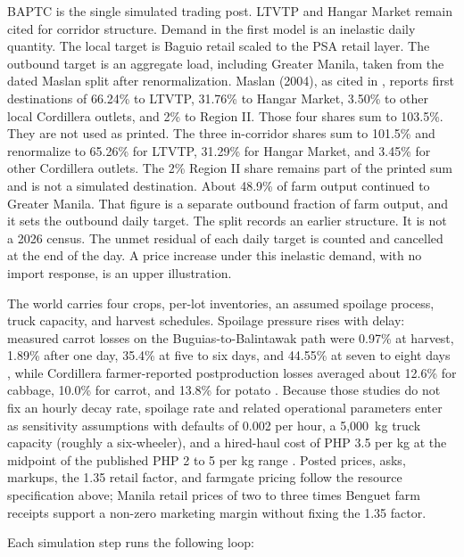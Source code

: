 \documentclass{icsthesis}
\begin{document}
\begin{mainmatter}
			BAPTC is the single simulated trading post. LTVTP and Hangar Market remain cited for corridor structure. Demand in the first model is an inelastic daily quantity. The local target is Baguio retail scaled to the PSA retail layer. The outbound target is an aggregate load, including Greater Manila, taken from the dated Maslan split after renormalization. Maslan (2004), as cited in \citet{Fangasan2009}, reports first destinations of 66.24\% to LTVTP, 31.76\% to Hangar Market, 3.50\% to other local Cordillera outlets, and 2\% to Region II. Those four shares sum to 103.5\%. They are not used as printed. The three in-corridor shares sum to 101.5\% and renormalize to 65.26\% for LTVTP, 31.29\% for Hangar Market, and 3.45\% for other Cordillera outlets. The 2\% Region II share remains part of the printed sum and is not a simulated destination. About 48.9\% of farm output continued to Greater Manila. That figure is a separate outbound fraction of farm output, and it sets the outbound daily target. The split records an earlier structure. It is not a 2026 census. The unmet residual of each daily target is counted and cancelled at the end of the day. A price increase under this inelastic demand, with no import response, is an upper illustration.

			The world carries four crops, per-lot inventories, an assumed spoilage process, truck capacity, and harvest schedules. Spoilage pressure rises with delay: measured carrot losses on the Buguias-to-Balintawak path were 0.97\% at harvest, 1.89\% after one day, 35.4\% at five to six days, and 44.55\% at seven to eight days \citep{Antolin2024}, while Cordillera farmer-reported postproduction losses averaged about 12.6\% for cabbage, 10.0\% for carrot, and 13.8\% for potato \citep{Fernandez2004}. Because those studies do not fix an hourly decay rate, spoilage rate and related operational parameters enter as sensitivity assumptions with defaults of 0.002 per hour, a 5,000~kg truck capacity (roughly a six-wheeler), and a hired-haul cost of PHP 3.5 per kg at the midpoint of the published PHP 2 to 5 per kg range \citep{deGuzmanBambicoBaconguis2023}. Posted prices, asks, markups, the 1.35 retail factor, and farmgate pricing follow the resource specification above; Manila retail prices of two to three times Benguet farm receipts support a non-zero marketing margin \citep{Launio2022} without fixing the 1.35 factor.

			Each simulation step runs the following loop:


\end{mainmatter}
\end{document}
